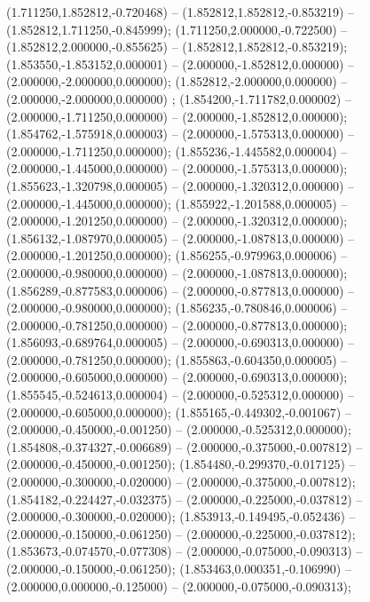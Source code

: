  (1.711250,1.852812,-0.720468) -- (1.852812,1.852812,-0.853219) -- (1.852812,1.711250,-0.845999);
 (1.711250,2.000000,-0.722500) -- (1.852812,2.000000,-0.855625) -- (1.852812,1.852812,-0.853219);
 (1.853550,-1.853152,0.000001) -- (2.000000,-1.852812,0.000000) -- (2.000000,-2.000000,0.000000);
 (1.852812,-2.000000,0.000000) -- (2.000000,-2.000000,0.000000) ;
 (1.854200,-1.711782,0.000002) -- (2.000000,-1.711250,0.000000) -- (2.000000,-1.852812,0.000000);
 (1.854762,-1.575918,0.000003) -- (2.000000,-1.575313,0.000000) -- (2.000000,-1.711250,0.000000);
 (1.855236,-1.445582,0.000004) -- (2.000000,-1.445000,0.000000) -- (2.000000,-1.575313,0.000000);
 (1.855623,-1.320798,0.000005) -- (2.000000,-1.320312,0.000000) -- (2.000000,-1.445000,0.000000);
 (1.855922,-1.201588,0.000005) -- (2.000000,-1.201250,0.000000) -- (2.000000,-1.320312,0.000000);
 (1.856132,-1.087970,0.000005) -- (2.000000,-1.087813,0.000000) -- (2.000000,-1.201250,0.000000);
 (1.856255,-0.979963,0.000006) -- (2.000000,-0.980000,0.000000) -- (2.000000,-1.087813,0.000000);
 (1.856289,-0.877583,0.000006) -- (2.000000,-0.877813,0.000000) -- (2.000000,-0.980000,0.000000);
 (1.856235,-0.780846,0.000006) -- (2.000000,-0.781250,0.000000) -- (2.000000,-0.877813,0.000000);
 (1.856093,-0.689764,0.000005) -- (2.000000,-0.690313,0.000000) -- (2.000000,-0.781250,0.000000);
 (1.855863,-0.604350,0.000005) -- (2.000000,-0.605000,0.000000) -- (2.000000,-0.690313,0.000000);
 (1.855545,-0.524613,0.000004) -- (2.000000,-0.525312,0.000000) -- (2.000000,-0.605000,0.000000);
 (1.855165,-0.449302,-0.001067) -- (2.000000,-0.450000,-0.001250) -- (2.000000,-0.525312,0.000000);
 (1.854808,-0.374327,-0.006689) -- (2.000000,-0.375000,-0.007812) -- (2.000000,-0.450000,-0.001250);
 (1.854480,-0.299370,-0.017125) -- (2.000000,-0.300000,-0.020000) -- (2.000000,-0.375000,-0.007812);
 (1.854182,-0.224427,-0.032375) -- (2.000000,-0.225000,-0.037812) -- (2.000000,-0.300000,-0.020000);
 (1.853913,-0.149495,-0.052436) -- (2.000000,-0.150000,-0.061250) -- (2.000000,-0.225000,-0.037812);
 (1.853673,-0.074570,-0.077308) -- (2.000000,-0.075000,-0.090313) -- (2.000000,-0.150000,-0.061250);
 (1.853463,0.000351,-0.106990) -- (2.000000,0.000000,-0.125000) -- (2.000000,-0.075000,-0.090313);
